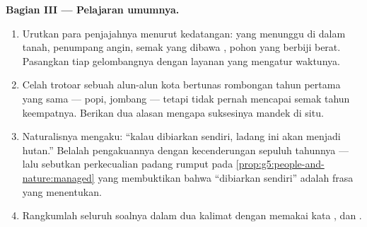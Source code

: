 \begin{problem}
\medskip\noindent\textbf{Bagian III --- Pelajaran umumnya.}
\begin{enumerate}[resume]
  \item Urutkan para penjajahnya menurut kedatangan:  yang
        menunggu di dalam tanah, penumpang angin, semak yang dibawa
        , pohon yang berbiji berat. Pasangkan tiap gelombangnya
        dengan layanan  yang mengatur waktunya.
  \item Celah trotoar sebuah alun-alun kota bertunas rombongan tahun
        pertama yang sama ---  popi, jombang --- tetapi tidak
        pernah mencapai semak tahun keempatnya. Berikan dua alasan
        mengapa suksesinya mandek di situ.
  \item Naturalisnya mengaku: ``kalau dibiarkan sendiri, ladang ini
        akan menjadi hutan.'' Belalah pengakuannya dengan
        kecenderungan sepuluh tahunnya --- lalu sebutkan perkecualian
        padang rumput pada
        \cref{prop:g5:people-and-nature:managed} yang membuktikan
        bahwa ``dibiarkan sendiri'' adalah frasa yang menentukan.
  \item Rangkumlah seluruh soalnya dalam dua kalimat dengan memakai
        kata \emph{}, \emph{} dan
        \emph{}.
\end{enumerate}
\end{problem}
